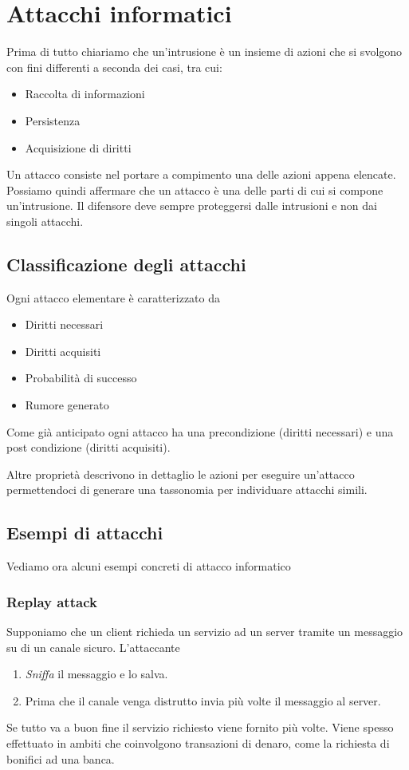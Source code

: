 \chapter{Attacchi informatici}
Prima di tutto chiariamo che un'intrusione è un insieme di azioni che si svolgono con fini differenti a seconda dei
casi, tra cui:
\begin{itemize}
	\item Raccolta di informazioni
	\item Persistenza
	\item Acquisizione di diritti
\end{itemize}
Un attacco consiste nel portare a compimento una delle azioni appena elencate. Possiamo quindi affermare che un
attacco è una delle parti di cui si compone un'intrusione. Il difensore deve sempre proteggersi dalle intrusioni e
non dai singoli attacchi.

\section{Classificazione degli attacchi}
Ogni attacco elementare è caratterizzato da
\begin{itemize}
	\item Diritti necessari
	\item Diritti acquisiti
	\item Probabilità di successo
	\item Rumore generato
\end{itemize}
Come già anticipato ogni attacco ha una precondizione (diritti necessari) e una post condizione (diritti acquisiti).

Altre proprietà descrivono in dettaglio le azioni per eseguire un'attacco permettendoci di generare una tassonomia
per individuare attacchi simili.

\section{Esempi di attacchi}
Vediamo ora alcuni esempi concreti di attacco informatico

\subsection{Replay attack}
Supponiamo che un client richieda un servizio ad un server tramite un messaggio su di un canale sicuro. L'attaccante
\begin{enumerate}
	\item \emph{Sniffa} il messaggio e lo salva.
	\item Prima che il canale venga distrutto invia più volte il messaggio al server.
\end{enumerate}
Se tutto va a buon fine il servizio richiesto viene fornito più volte. Viene spesso effettuato in ambiti che
coinvolgono transazioni di denaro, come la richiesta di bonifici ad una banca.


